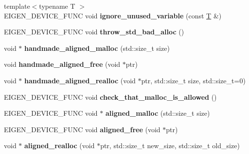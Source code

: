 \begin{DoxyCompactItemize}
{\footnotesize template$<$typename T $>$ }\\E\+I\+G\+E\+N\+\_\+\+D\+E\+V\+I\+C\+E\+\_\+\+F\+U\+NC void {\bfseries ignore\+\_\+unused\+\_\+variable} (const \hyperlink{group___sparse_core___module}{T} \&)
\item 
\mbox{\label{namespace_eigen_1_1internal_aa03c647c0da4f77a83252fd9bd097ca4}} 
E\+I\+G\+E\+N\+\_\+\+D\+E\+V\+I\+C\+E\+\_\+\+F\+U\+NC void {\bfseries throw\+\_\+std\+\_\+bad\+\_\+alloc} ()
\item 
\mbox{\label{namespace_eigen_1_1internal_a953346c5e1a0a5efbcc19ed387021548}} 
void $\ast$ {\bfseries handmade\+\_\+aligned\+\_\+malloc} (std\+::size\+\_\+t size)
\item 
\mbox{\label{namespace_eigen_1_1internal_a2a2e468d0c36a0b52ab8e22efdc6ca67}} 
void {\bfseries handmade\+\_\+aligned\+\_\+free} (void $\ast$ptr)
\item 
\mbox{\label{namespace_eigen_1_1internal_a1fa3c8ec559634a7161cd0ac7669ff7d}} 
void $\ast$ {\bfseries handmade\+\_\+aligned\+\_\+realloc} (void $\ast$ptr, std\+::size\+\_\+t size, std\+::size\+\_\+t=0)
\item 
\mbox{\label{namespace_eigen_1_1internal_aade40fb602f8649b396fd4f20494884e}} 
E\+I\+G\+E\+N\+\_\+\+D\+E\+V\+I\+C\+E\+\_\+\+F\+U\+NC void {\bfseries check\+\_\+that\+\_\+malloc\+\_\+is\+\_\+allowed} ()
\item 
\mbox{\label{namespace_eigen_1_1internal_a085e514c677ac3bb48f3c3674a372865}} 
E\+I\+G\+E\+N\+\_\+\+D\+E\+V\+I\+C\+E\+\_\+\+F\+U\+NC void $\ast$ {\bfseries aligned\+\_\+malloc} (std\+::size\+\_\+t size)
\item 
\mbox{\label{namespace_eigen_1_1internal_adad153f95799bcc02d86235418c0a73f}} 
E\+I\+G\+E\+N\+\_\+\+D\+E\+V\+I\+C\+E\+\_\+\+F\+U\+NC void {\bfseries aligned\+\_\+free} (void $\ast$ptr)
\item 
\mbox{\label{namespace_eigen_1_1internal_a16d5dc316b1f498b3690f3c0c8d40c5d}} 
void $\ast$ {\bfseries aligned\+\_\+realloc} (void $\ast$ptr, std\+::size\+\_\+t new\+\_\+size, std\+::size\+\_\+t old\+\_\+size)

\end{DoxyCompactItemize}
